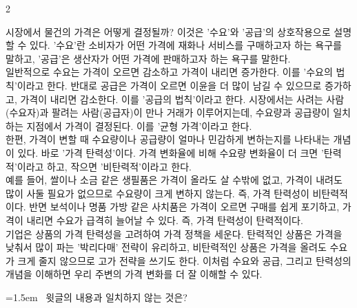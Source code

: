 \documentclass[10pt, a4paper]{article}
\begin{document}
\begin{multicols}{2}
\begin{passagebox}
\noindent{}시장에서 물건의 가격은 어떻게 결정될까? 이것은 '수요'와 '공급'의 상호작용으로 설명할 수 있다. '수요'란 소비자가 어떤 가격에 재화나 서비스를 구매하고자 하는 욕구를 말하고, '공급'은 생산자가 어떤 가격에 판매하고자 하는 욕구를 말한다. \\
일반적으로 수요는 가격이 오르면 감소하고 가격이 내리면 증가한다. 이를 '수요의 법칙'이라고 한다. 반대로 공급은 가격이 오르면 이윤을 더 많이 남길 수 있으므로 증가하고, 가격이 내리면 감소한다. 이를 '공급의 법칙'이라고 한다. 시장에서는 사려는 사람(수요자)과 팔려는 사람(공급자)이 만나 거래가 이루어지는데, 수요량과 공급량이 일치하는 지점에서 가격이 결정된다. 이를 '균형 가격'이라고 한다.
\\[0.5em]
한편, 가격이 변할 때 수요량이나 공급량이 얼마나 민감하게 변하는지를 나타내는 개념이 있다. 바로 '가격 탄력성'이다. 가격 변화율에 비해 수요량 변화율이 더 크면 '탄력적'이라고 하고, 작으면 '비탄력적'이라고 한다. \\
예를 들어, 쌀이나 소금 같은 생필품은 가격이 올라도 살 수밖에 없고, 가격이 내려도 많이 사둘 필요가 없으므로 수요량이 크게 변하지 않는다. 즉, 가격 탄력성이 비탄력적이다. 반면 보석이나 명품 가방 같은 사치품은 가격이 오르면 구매를 쉽게 포기하고, 가격이 내리면 수요가 급격히 늘어날 수 있다. 즉, 가격 탄력성이 탄력적이다.
\\[0.5em]
기업은 상품의 가격 탄력성을 고려하여 가격 정책을 세운다. 탄력적인 상품은 가격을 낮춰서 많이 파는 '박리다매' 전략이 유리하고, 비탄력적인 상품은 가격을 올려도 수요가 크게 줄지 않으므로 고가 전략을 쓰기도 한다. 이처럼 수요와 공급, 그리고 탄력성의 개념을 이해하면 우리 주변의 가격 변화를 더 잘 이해할 수 있다.
\end{passagebox}
\vspace{1mm}

\noindent\begin{minipage}{\columnwidth}
\vspace{2mm}
{\hangindent=1.5em  ~윗글의 내용과 일치하지 않는 것은?\par}


\end{minipage}
\end{multicols}
\end{document}
